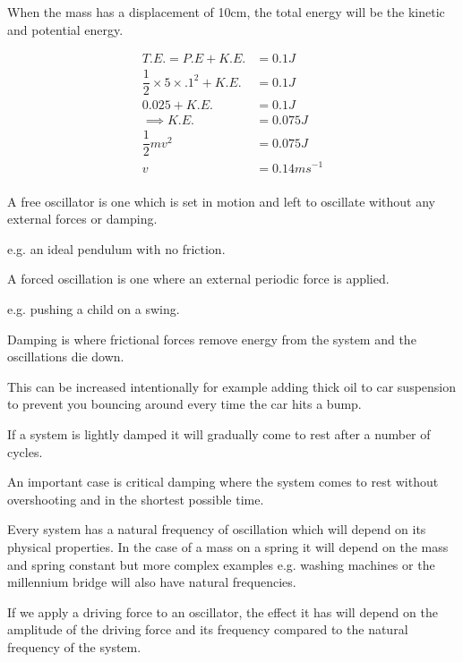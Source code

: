 \documentclass[revision-guide.tex]{subfiles}
\begin{document}
When the mass has a displacement of 10cm, the total energy will be the kinetic and potential energy.


\begin{align*} 
T.E. = P.E + K.E. &= 0.1J \\
 \dfrac{1}{2} \times 5 \times .1^2 + K.E. &= 0.1J\\
 0.025 + K.E. &= 0.1J  \\
 \implies K.E. &= 0.075J \\
 \dfrac{1}{2}mv^2 &= 0.075J \\
 v &= 0.14 ms^{-1} \\
 \end{align*}



\pagebreak


A free oscillator is one which is set in motion and left to oscillate without any external forces or damping.

e.g. an ideal pendulum with no friction.

A forced oscillation is one where an external periodic force is applied. 

e.g. pushing a child on a swing.

Damping is where frictional forces remove energy from the system and the oscillations die down.

This can be increased intentionally for example adding thick oil to car suspension to prevent you bouncing around every time the car hits a bump.

If a system is lightly damped it will gradually come to rest after a number of cycles. 

An important case is critical damping where the system comes to rest without overshooting and in the shortest possible time. 

 


Every system has a natural frequency of oscillation which will depend on its physical properties. In the case of a mass on a spring it will depend on the mass and spring constant but more complex examples e.g. washing machines or the millennium bridge will also have natural frequencies.

If we apply a driving force to an oscillator, the effect it has will depend on the amplitude of the driving force and its frequency compared to the natural frequency of the system. 
\end{document}
